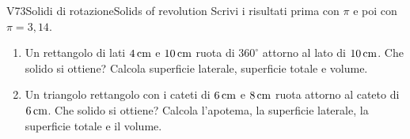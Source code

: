\begin{esercizio}{V7}{3}{Solidi di rotazione}{Solids of revolution}
Scrivi i risultati prima con $\pi$ e poi con $\pi=3,14$. 
\begin{enumerate}
\item Un rettangolo di lati $4\,\mathrm{cm}$ e $10\,\mathrm{cm}$ ruota di $360^\circ$ attorno al lato di $10\,\mathrm{cm}$. Che solido si ottiene? Calcola superficie laterale, superficie totale e volume.
\item Un triangolo rettangolo con i cateti di $6\,\mathrm{cm}$ e $8\,\mathrm{cm}$ ruota attorno al cateto di $6\,\mathrm{cm}$. Che solido si ottiene? Calcola l'apotema, la superficie laterale, la superficie totale e il volume.
\end{enumerate}
\end{esercizio}
